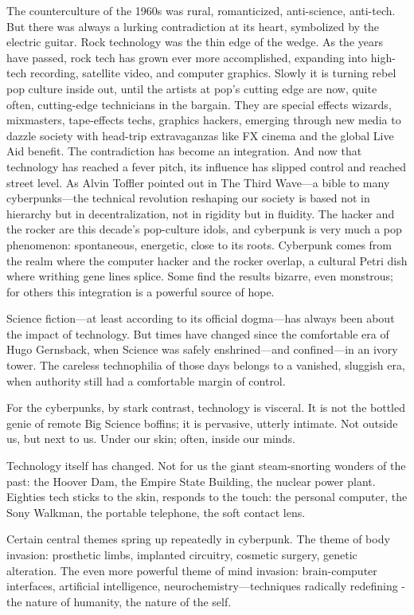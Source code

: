 The counterculture of the 1960s was rural, romanticized, anti-science, anti-tech. But there was always a lurking contradiction at its heart, symbolized by the electric guitar. Rock technology was the thin edge of the wedge. As the years have passed, rock tech has grown ever more accomplished, expanding into high-tech recording, satellite video, and computer graphics. Slowly it is turning rebel pop culture inside out, until the artists at pop's cutting edge are now, quite often, cutting-edge technicians in the bargain. They are special effects wizards, mixmasters, tape-effects techs, graphics hackers, emerging through new media to dazzle society with head-trip extravaganzas like FX cinema and the global Live Aid benefit. The contradiction has become an integration.
And now that technology has reached a fever pitch, its influence has slipped control and reached street level. As Alvin Toffler pointed out in The Third Wave—a bible to many cyberpunks—the technical revolution reshaping our society is based not in hierarchy but in decentralization, not in rigidity but in fluidity.
The hacker and the rocker are this decade's pop-culture idols, and cyberpunk is very much a pop phenomenon: spontaneous, energetic, close to its roots. Cyberpunk comes from the realm where the computer hacker and the rocker overlap, a cultural Petri dish where writhing gene lines splice. Some find the results bizarre, even monstrous; for others this integration is a powerful source of hope.

Science fiction—at least according to its official dogma—has always been about the impact of technology. But times have changed since the comfortable era of Hugo Gernsback, when Science was safely enshrined—and confined—in an ivory tower. The careless technophilia of those days belongs to a vanished, sluggish era, when authority still had a comfortable margin of control.

For the cyberpunks, by stark contrast, technology is visceral. It is not the bottled genie of remote Big Science boffins; it is pervasive, utterly intimate. Not outside us, but next to us. Under our skin; often, inside our minds.

Technology itself has changed. Not for us the giant steam-snorting wonders of the past: the Hoover Dam, the Empire State Building, the nuclear power plant. Eighties tech sticks to the skin, responds to the touch: the personal computer, the Sony Walkman, the portable telephone, the soft contact lens.

Certain central themes spring up repeatedly in cyberpunk. The theme of body invasion: prosthetic limbs, implanted circuitry, cosmetic surgery, genetic alteration. The even more powerful theme of mind invasion: brain-computer interfaces, artificial intelligence, neurochemistry—techniques radically redefining - the nature of humanity, the nature of the self.


